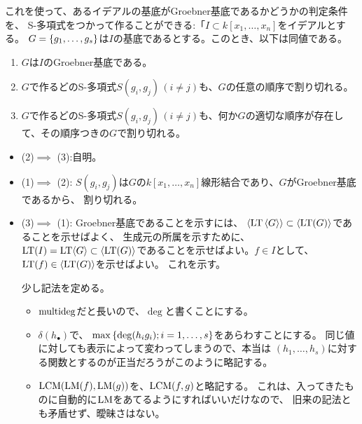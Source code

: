 これを使って、あるイデアルの基底がGroebner基底であるかどうかの判定条件を、
S-多項式をつかって作ることができる:「$I\subset k[x_1,\dots,x_n]$をイデアルとする。
$G=\left\{g_1,\dots,g_s\right\}$は$I$の基底であるとする。このとき、以下は同値である。
\begin{enumerate}[label=(\arabic*)]
  \item $G$は$I$のGroebner基底である。
  \item $G$で作るどのS-多項式$S(g_i,g_j)\, (i\neq j)$も、$G$の任意の順序で割り切れる。
  \item $G$で作るどのS-多項式$S(g_i,g_j)\, (i\neq j)$も、何か$G$の適切な順序が存在して、その順序つきの$G$で割り切れる。
\end{enumerate}
\begin{myproof}
  \begin{itemize}
    \item (2)$\implies$ (3):自明。
    \item (1)$\implies$ (2):
    $S(g_i,g_j)$は$G$の$k[x_1,\dots,x_n]$線形結合であり、$G$がGroebner基底であるから、
    割り切れる。
    \item (3)$\implies$ (1):
    Groebner基底であることを示すには、
    $\left\langle {\rm LT}\left\langle G \right\rangle \right\rangle\subset \left\langle {\rm LT}(G) \right\rangle$であることを示せばよく、
    生成元の所属を示すために、${\rm LT}(I) = {\rm LT}{\left\langle G \right\rangle} \subset \left\langle {\rm LT}(G) \right\rangle$であることを示せばよい。$f\in I$として、${\rm LT}(f)\in \left\langle {\rm LT}(G) \right\rangle$を示せばよい。
    これを示す。

    少し記法を定める。
    \begin{itemize}
      \item $\mathrm{multideg}$だと長いので、$\deg$と書くことにする。
      \item $\delta(h_\bullet)$で、
      $\max\left\{\deg(h_ig_i) ; i=1,\dots,s\right\}$をあらわすことにする。
      同じ値に対しても表示によって変わってしまうので、本当は
      $(h_1,\dots,h_s)$に対する関数とするのが正当だろうがこのように略記する。
      \item $\mathrm{LCM}({\rm LM}(f),{\rm LM}(g))$を、$\mathrm{LCM}(f,g)$と略記する。
      これは、入ってきたものに自動的に${\rm LM}$をあてるようにすればいいだけなので、
      旧来の記法とも矛盾せず、曖昧さはない。
    \end{itemize}


\end{itemize}
\end{myproof}
